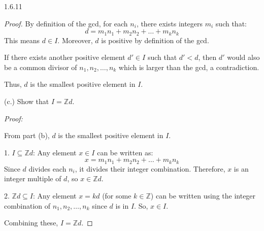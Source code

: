 \documentclass[12pt]{amsart}
\theoremstyle{definition}
\numberwithin{equation}{section}
\theoremstyle{plain}
\newcommand{\Z}{\mathbb{Z}}
\begin{document}
\begin{exercise}{1.6.11}
\begin{proof}
        By definition of the gcd, for each \( n_i \), there exists integers \( m_i \) such that:
        \[ d = m_1n_1 + m_2n_2 + \dots + m_kn_k \]
        This means \( d \in I \). Moreover, \( d \) is positive by definition of the gcd.
        
        If there exists another positive element \( d' \in I \) such that \( d' < d \), then \( d' \) would also be a common divisor of \( n_1, n_2, \dots, n_k \) which is larger than the gcd, a contradiction.
        
        Thus, \( d \) is the smallest positive element in \( I \).
        
        (c.) Show that \( I = \Z d \).
        
        \textit{Proof:}
        
        From part (b), \( d \) is the smallest positive element in \( I \). 
        
        1. \( I \subseteq \Z d \):
        Any element \( x \in I \) can be written as:
        \[ x = m_1n_1 + m_2n_2 + \dots + m_kn_k \]
        Since \( d \) divides each \( n_i \), it divides their integer combination. Therefore, \( x \) is an integer multiple of \( d \), so \( x \in \Z d \).
        
        2. \( \Z d \subseteq I \):
        Any element \( x = kd \) (for some \( k \in \Z \)) can be written using the integer combination of \( n_1, n_2, \dots, n_k \) since \( d \) is in \( I \). So, \( x \in I \).
        
        Combining these, \( I = \Z d \).
    \end{proof}
\end{exercise}
\end{document}
